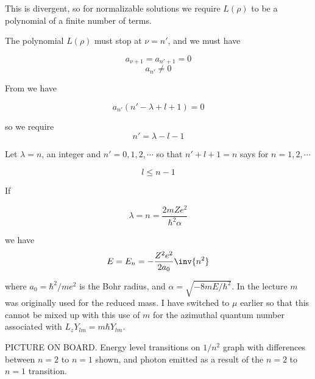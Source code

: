 This is divergent, so for normalizable solutions we require $L(\rho)$ to be a polynomial of a finite number of terms.

The polynomial $L(\rho)$ must stop at $\nu = n'$, and we must have

\begin{equation}\label{eqn:PHY356FLecture10:260}
a_{\nu+1} = a_{n' +1} = 0
\end{equation}
\begin{equation}\label{eqn:PHY356FLecture10:270}
a_{n'} \ne 0
\end{equation}

From  we have

\begin{equation}\label{eqn:PHY356FLecture10:200a}
a_{n'} \left(
n' - \lambda + l + 1
\right)
=0
\end{equation}

so we require
\begin{equation}\label{eqn:PHY356FLecture10:280}
n' = \lambda - l - 1
\end{equation}

Let $\lambda = n$, an integer and $n' = 0, 1, 2, \cdots$ so that $n' + l + 1 = n$ says for $n= 1,2, \cdots$

\begin{equation}\label{eqn:PHY356FLecture10:290}
l \le n-1
\end{equation}

If

\begin{equation}\label{eqn:PHY356FLecture10:300}
\lambda = n = \frac{2 m Z e^2 }{\hbar^2 \alpha}
\end{equation}

we have
\begin{equation}\label{eqn:PHY356FLecture10:310}
E = E_n = - \frac{Z^2 e^2 }{2 a_0} \inv{n^2}
\end{equation}

where $a_0 = \hbar^2/m e^2$ is the Bohr radius, and $\alpha = \sqrt{-8 m E/\hbar^2}$.  In the lecture $m$ was originally used for the reduced mass.  I have switched to $\mu$ earlier so that this cannot be mixed up with this use of $m$ for the azimuthal quantum number associated with $L_z Y_{lm} = m \hbar Y_{lm}$.

PICTURE ON BOARD.  Energy level transitions on $1/n^2$ graph with differences between $n=2$ to $n=1$ shown, and photon emitted as a result of the $n=2$ to $n=1$ transition.

